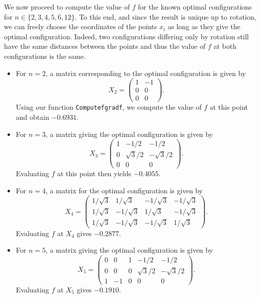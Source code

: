 \documentclass{article}
\begin{document}
\newline
We now proceed to compute the value of $f$ for the known optimal configurations for $n\in\{2, 3, 4, 5, 6, 12\}$. To this end, and since the result is unique up to rotation, we can freely choose the coordinates of the points $x_i$ as long as they give the optimal configuration. Indeed, two configurations differing only by rotation still have the same distances between the points and thus the value of $f$ at both configurations is the same.\\
\setcounter{MaxMatrixCols}{12}
\begin{itemize}
    \item For $n=2$, a matrix corresponding to the optimal configuration is given by
          $$
          X_2 = \begin{pmatrix}1 & -1\\ 0 & 0 \\ 0 & 0\end{pmatrix}.
          $$
          Using our function \texttt{Computefgradf}, we compute the value of $f$ at this point and obtain $-0.6931$.
    \item For $n=3$, a matrix giving the optimal configuration is given by
          $$
          X_3 = \begin{pmatrix}1 & -1/2 & -1/2\\ 0 & \sqrt{3}/2 & -\sqrt{3}/2\\ 0 & 0 & 0 \end{pmatrix}.
          $$
          Evaluating $f$ at this point then yields $-0.4055$.
    \item For $n=4$, a matrix for the optimal configuration is given by
          $$
          X_4 = \begin{pmatrix} 1/\sqrt{3} & 1/\sqrt{3} & -1/\sqrt{3} & -1/\sqrt{3} \\ 1/\sqrt{3} & -1/\sqrt{3} & 1/\sqrt{3} & -1/\sqrt{3} \\ 1/\sqrt{3} & -1/\sqrt{3} & -1/\sqrt{3} & 1/\sqrt{3}\end{pmatrix}.
          $$
          Evaluating $f$ at $X_4$ gives $-0.2877$.
    \item For $n=5$, a matrix giving the optimal configuration is given by
          $$
          X_5 = \begin{pmatrix} 0 & 0 & 1 & -1/2 & -1/2 \\ 0 & 0 & 0 & \sqrt{3}/2 & -\sqrt{3}/2 \\ 1 & -1 & 0 & 0 & 0\end{pmatrix}.
          $$
          Evaluating $f$ at $X_5$ gives $-0.1910$.

\end{itemize}
\end{document}
